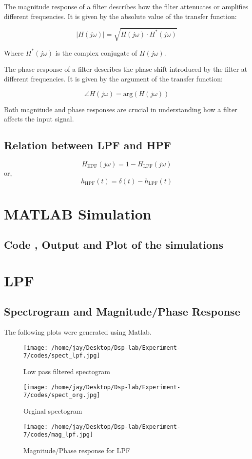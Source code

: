 \documentclass[journal,12pt,onecolumn]{IEEEtran}
\theoremstyle{remark}
\begin{document}
The magnitude response of a filter describes how the filter attenuates or amplifies different frequencies. It is given by the absolute value of the transfer function:

\[
|H(j\omega)| = \sqrt{H(j\omega) \cdot H^*(j\omega)}
\]

Where $H^*(j\omega)$ is the complex conjugate of $H(j\omega)$.

The phase response of a filter describes the phase shift introduced by the filter at different frequencies. It is given by the argument of the transfer function:

\[
\angle H(j\omega) = \text{arg}(H(j\omega))
\]

Both magnitude and phase responses are crucial in understanding how a filter affects the input signal.

\subsection{Relation between LPF and HPF}

\[
H_{\text{HPF}}(j\omega) = 1 - H_{\text{LPF}}(j\omega)
\]
or,\\
\[
h_{\text{HPF}}(t) = \delta(t) - h_{\text{LPF}}(t)
\]

\section{MATLAB Simulation}

\subsection{Code , Output and Plot of the simulations}


\section{LPF}
\subsection{Spectrogram and Magnitude/Phase Response}
The following plots were generated using Matlab.
\begin{figure}[ht] %
  \centering
  \begin{minipage}[t]{0.45\textwidth}
    \texttt{[image: /home/jay/Desktop/Dsp-lab/Experiment-7/codes/spect\_lpf.jpg]}
    \caption{Low pass filtered spectogram}
  \end{minipage}\hfill
  \begin{minipage}[t]{0.45\textwidth}
    \texttt{[image: /home/jay/Desktop/Dsp-lab/Experiment-7/codes/spect\_org.jpg]}
    \caption{Orginal spectogram}
  \end{minipage}
\end{figure}\begin{figure}[ht] %
  \centering
  \texttt{[image: /home/jay/Desktop/Dsp-lab/Experiment-7/codes/mag\_lpf.jpg]}
  \caption{Magnitude/Phase response for LPF}
\end{figure}
\end{document}
